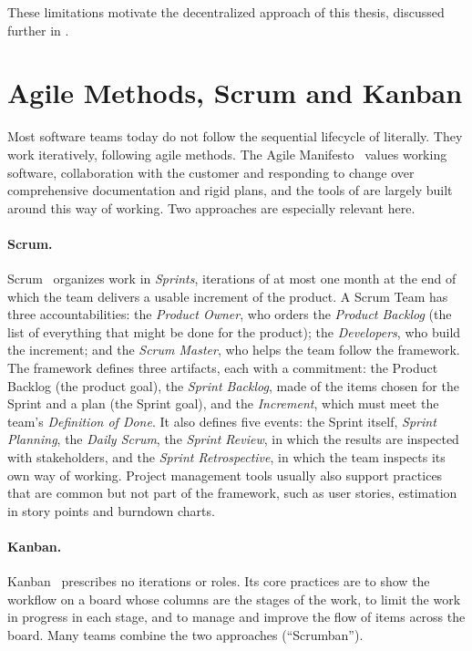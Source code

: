 These limitations motivate the decentralized approach of this thesis, discussed further in .

\section{Agile Methods, Scrum and Kanban}
\label{sec:agile}

Most software teams today do not follow the sequential lifecycle of  literally. They work iteratively, following agile methods. The Agile Manifesto~\cite{agilemanifesto} values working software, collaboration with the customer and responding to change over comprehensive documentation and rigid plans, and the tools of  are largely built around this way of working. Two approaches are especially relevant here.

\paragraph{Scrum.} Scrum~\cite{scrumguide2020} organizes work in \emph{Sprints}, iterations of at most one month at the end of which the team delivers a usable increment of the product. A Scrum Team has three accountabilities: the \emph{Product Owner}, who orders the \emph{Product Backlog} (the list of everything that might be done for the product); the \emph{Developers}, who build the increment; and the \emph{Scrum Master}, who helps the team follow the framework. The framework defines three artifacts, each with a commitment: the Product Backlog (the product goal), the \emph{Sprint Backlog}, made of the items chosen for the Sprint and a plan (the Sprint goal), and the \emph{Increment}, which must meet the team's \emph{Definition of Done}. It also defines five events: the Sprint itself, \emph{Sprint Planning}, the \emph{Daily Scrum}, the \emph{Sprint Review}, in which the results are inspected with stakeholders, and the \emph{Sprint Retrospective}, in which the team inspects its own way of working. Project management tools usually also support practices that are common but not part of the framework, such as user stories, estimation in story points and burndown charts.

\paragraph{Kanban.} Kanban~\cite{anderson2010kanban} prescribes no iterations or roles. Its core practices are to show the workflow on a board whose columns are the stages of the work, to limit the work in progress in each stage, and to manage and improve the flow of items across the board. Many teams combine the two approaches (``Scrumban'').

